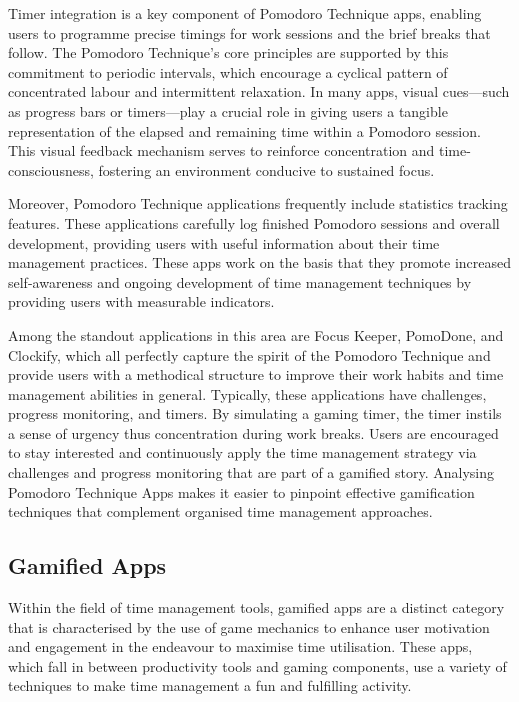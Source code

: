 \documentclass{l4proj}
\begin{document}
Timer integration is a key component of Pomodoro Technique apps, enabling users to programme precise timings for work sessions and the brief breaks that follow. The Pomodoro Technique's core principles are supported by this commitment to periodic intervals, which encourage a cyclical pattern of concentrated labour and intermittent relaxation. In many apps, visual cues—such as progress bars or timers—play a crucial role in giving users a tangible representation of the elapsed and remaining time within a Pomodoro session. This visual feedback mechanism serves to reinforce concentration and time-consciousness, fostering an environment conducive to sustained focus.

Moreover, Pomodoro Technique applications frequently include statistics tracking features. These applications carefully log finished Pomodoro sessions and overall development, providing users with useful information about their time management practices. These apps work on the basis that they promote increased self-awareness and ongoing development of time management techniques by providing users with measurable indicators.

Among the standout applications in this area are Focus Keeper, PomoDone, and Clockify, which all perfectly capture the spirit of the Pomodoro Technique and provide users with a methodical structure to improve their work habits and time management abilities in general. Typically, these applications have challenges, progress monitoring, and timers. By simulating a gaming timer, the timer instils a sense of urgency thus concentration during work breaks. Users are encouraged to stay interested and continuously apply the time management strategy via challenges and progress monitoring that are part of a gamified story. Analysing Pomodoro Technique Apps makes it easier to pinpoint effective gamification techniques that complement organised time management approaches.

\subsection{Gamified Apps}
Within the field of time management tools, gamified apps are a distinct category that is characterised by the use of game mechanics to enhance user motivation and engagement in the endeavour to maximise time utilisation. These apps, which fall in between productivity tools and gaming components, use a variety of techniques to make time management a fun and fulfilling activity.
\end{document}
